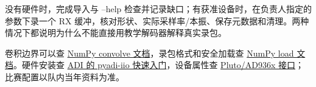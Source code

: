 \begin{exercise}\label{ex:v2-sdr-capture}
没有硬件时，完成导入与 --help 检查并记录缺口；有获准设备时，在负责人指定的参数下录一个 RX 缓冲，核对形状、实际采样率/本振、保存元数据和清理。两种情况下都说明为什么不能直接用教学解码器解释真实录包。
\end{exercise}

卷积边界可以查 \href{https://numpy.org/doc/stable/reference/generated/numpy.convolve.html}{NumPy convolve 文档}，录包格式和安全加载查 \href{https://numpy.org/doc/stable/reference/generated/numpy.load.html}{NumPy load 文档}。硬件安装查 \href{https://analogdevicesinc.github.io/pyadi-iio/guides/quick.html}{ADI 的 pyadi-iio 快速入门}，设备属性查 \href{https://github.com/analogdevicesinc/pyadi-iio/blob/main/adi/ad936x.py}{Pluto/AD936x 接口}；比赛配置以队内当年资料为准。
